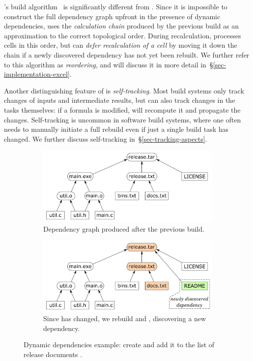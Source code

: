 \Excel's build algorithm~\cite{excel_recalc} is significantly different from
\Make. Since it is impossible to construct the full dependency graph upfront in
the presence of dynamic dependencies, \Excel uses the \emph{calculation chain}
produced by the previous build as an approximation to the correct topological
order. During recalculation, \Excel processes cells in this order, but can
\emph{defer recalculation of a cell} by moving it down the chain if a newly
discovered dependency has not yet been rebuilt. We further refer to this
algorithm as \emph{reordering}, and will discuss it in more detail
in~\S\ref{sec-implementation-excel}.

Another distinguishing feature of \Excel is \emph{self-tracking}. Most build
systems only track changes of inputs and intermediate results, but \Excel can
also track changes in the tasks themselves: if a formula is modified, \Excel
will recompute it and propagate the changes. Self-tracking is uncommon in
software build systems, where one often needs to manually initiate a full
rebuild even if just a single build task has changed. We further discuss
self-tracking in~\S\ref{sec-tracking-aspects}.

\begin{figure}[h]
\begin{subfigure}[b]{0.90\linewidth}
\centerline{\includegraphics[scale=0.28]{fig/shake-example.pdf}}
\caption{Dependency graph produced after the previous build.}
\end{subfigure}
\begin{subfigure}[b]{0.90\linewidth}
\centerline{\includegraphics[scale=0.28]{fig/shake-example-rebuild.pdf}}
\caption{Since  has changed, we rebuild  and
, discovering a new dependency.}
\end{subfigure}
\caption{Dynamic dependencies example: create  and add it to the
list of release documents .\label{fig-shake}}
\end{figure}

